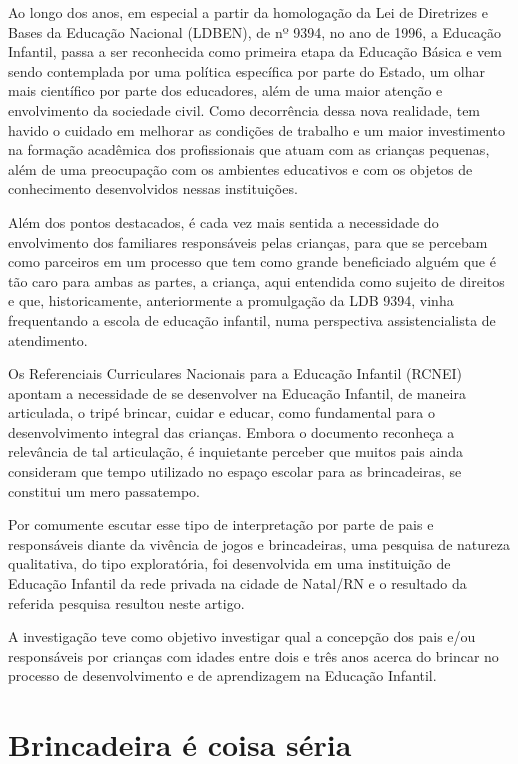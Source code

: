 \begin{refsection}
    Ao longo dos anos, em especial a partir da homologação da Lei de Diretrizes e Bases da Educação Nacional (LDBEN), de nº 9394, no ano de 1996, a Educação Infantil, passa a ser reconhecida como primeira etapa da Educação Básica e vem sendo contemplada por uma política específica por parte do Estado, um olhar mais científico por parte dos educadores, além de uma maior atenção e envolvimento da sociedade civil. Como decorrência dessa nova realidade, tem havido o cuidado em melhorar as condições de trabalho e um maior investimento na formação acadêmica dos profissionais que atuam com as crianças pequenas, além de uma preocupação com os ambientes educativos e com os objetos de conhecimento desenvolvidos nessas instituições. 

    Além dos pontos destacados, é cada vez mais sentida a necessidade do envolvimento dos familiares responsáveis pelas crianças, para que se percebam como parceiros em um processo que tem como grande beneficiado alguém que é tão caro para ambas as partes, a criança, aqui entendida como sujeito de direitos e que, historicamente, anteriormente a promulgação da LDB 9394, vinha frequentando a escola de educação infantil, numa perspectiva assistencialista de atendimento. 

    Os Referenciais Curriculares Nacionais para a Educação Infantil (RCNEI) apontam a necessidade de se desenvolver na Educação Infantil, de maneira articulada, o tripé brincar, cuidar e educar, como fundamental para o desenvolvimento integral das crianças. Embora o documento reconheça a relevância de tal articulação, é inquietante perceber que muitos pais ainda consideram que tempo utilizado no espaço escolar para as brincadeiras, se constitui um mero passatempo.

    Por comumente escutar esse tipo de interpretação por parte de pais e responsáveis diante da vivência de jogos e brincadeiras, uma pesquisa de natureza qualitativa, do tipo exploratória, foi desenvolvida em uma instituição de Educação Infantil da rede privada na cidade de Natal/RN e o resultado da referida pesquisa resultou neste artigo.  

    A investigação teve como objetivo investigar qual a concepção dos pais e/ou responsáveis por crianças com idades entre dois e três anos acerca do brincar no processo de desenvolvimento e de aprendizagem na Educação Infantil. 


    \section{Brincadeira é coisa séria}


\end{refsection}
